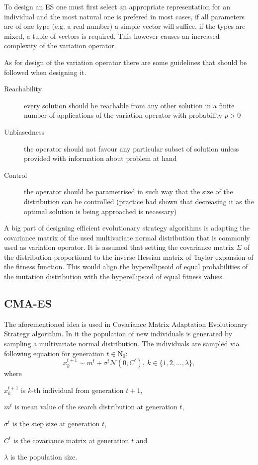 To design an ES one must first select an appropriate representation for an individual and the most natural one is prefered in most cases, if all parameters are of one type (e.g. a real number) a simple vector will suffice, if the types are mixed, a tuple of vectors is required. This however causes an increased complexity of the variation operator.

As for design of the variation operator there are some guidelines that should be followed when designing it.
\begin{description}
    \item[Reachability] every solution should be reachable from any other solution in a finite number of applications of the variation operator with probability $p > 0$
    \item[Unbiasedness] the operator should not favour any particular subset of solution unless provided with information about problem at hand
    \item[Control] the operator should be parametrised in such way that the size of the distribution can be controlled (practice had shown that decreasing it as the optimal solution is being approached is necessary) 
\end{description}

A big part of designing efficient evolutionary strategy algorithms is adapting the covariance matrix of the used multivariate normal distribution that is commonly used as variation operator. It is assumed that setting the covariance matrix $\Sigma$ of the distribution proportional to the inverse Hessian matrix of Taylor expansion of the fitness function. This would align the hyperellipsoid of equal probabilities of the mutation distribution with the hyperellipsoid of equal fitness values.

\subsection{CMA-ES}
\label{subsec:cma-es}
The aforementioned idea is used in Covariance Matrix Adaptation Evolutionary Strategy algorithm.\cite{hansen2016cma} In it the population of new individuals is generated by sampling a multivariate normal distribution. The individuals are sampled via following equation for generation $t \in \mathrm{N}_0$:
\begin{equation}
    x_k^{t+1} \sim m^t + \sigma^t\mathcal{N}(0,C^t),\ k\in \{1,2,\dots,\lambda\}, 
\end{equation}
where 
\begin{description}
    \item $x_k^{t+1}$ is $k$-th individual from generation $t+1$, 
    \item $m^t$ is mean value of the search distribution at generation $t$,
    \item $\sigma^t$ is the step size at generation $t$,
    \item $C^t$ is the covariance matrix at generation $t$ and
    \item $\lambda$ is the population size.
\end{description}

